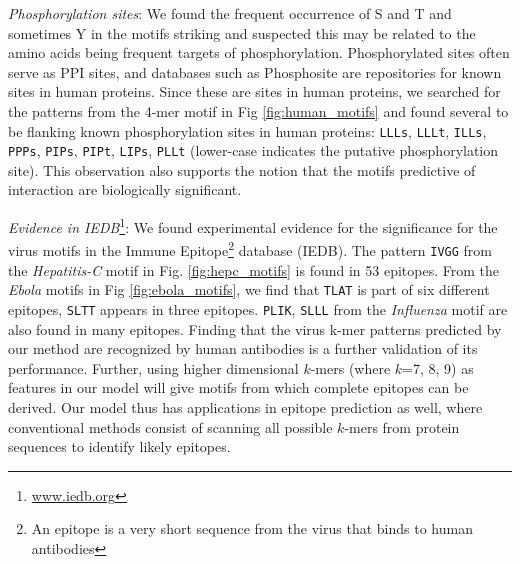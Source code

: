 \documentclass[a4paper,11pt]{article}
\begin{document}



 \noindent\emph{Phosphorylation sites}: 
 We found the frequent occurrence of S and T and sometimes Y in the motifs striking and suspected this may be
 related to the amino acids being frequent targets of phosphorylation.
 Phosphorylated sites often serve as PPI sites, and databases such as Phosphosite are
  repositories for known sites in human proteins. Since these are sites in human proteins, we searched for the patterns
	from the 4-mer motif in Fig \ref{fig:human_motifs} and found several to be flanking known phosphorylation sites in human proteins:
	\texttt{LLLs}, \texttt{LLLt}, \texttt{ILLs}, \texttt{PPPs}, \texttt{PIPs}, \texttt{PIPt}, \texttt{LIPs}, \texttt{PLLt} (lower-case indicates the putative phosphorylation site). This observation also supports the notion that the motifs predictive
	of interaction are biologically significant.

\noindent\emph{Evidence in IEDB}\footnote{\url{www.iedb.org}}:
We found experimental evidence for the significance for the virus motifs in the Immune Epitope\footnote{An epitope is a very short sequence from the virus that binds to human antibodies} database (IEDB).
The pattern \texttt{IVGG} from the \textit{Hepatitis-C} motif in Fig. \ref{fig:hepc_motifs} is found in 53 epitopes.
From the \textit{Ebola} motifs in Fig \ref{fig:ebola_motifs}, we find that \texttt{TLAT} is part of six different epitopes, \texttt{SLTT} appears in three epitopes. \texttt{PLIK}, \texttt{SLLL} from the \textit{Influenza} motif are also found in many epitopes.
Finding that the virus k-mer patterns predicted by our method are recognized by human antibodies
is a further validation of its performance.
Further, using higher dimensional $k$-mers (where $k$=7, 8, 9) as
features in our model will give motifs from which complete epitopes can be derived. %
Our model thus has applications in epitope prediction as well, where conventional methods consist of scanning all possible $k$-mers from protein sequences to identify likely epitopes.
\end{document}
